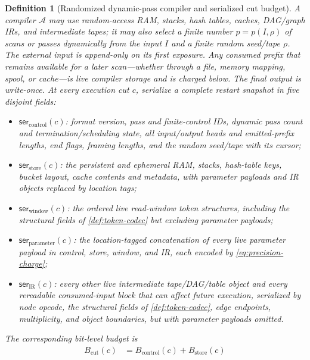 \documentclass[a4paper,twocolumn,10pt,unpublished]{quantumarticle}
\newtheorem{definition}{Definition}
\begin{document}
\begin{definition}[Randomized dynamic-pass compiler and serialized cut budget]
\label{def:compiler}
A compiler $\mathcal A$ may use random-access RAM, stacks, hash tables,
caches, DAG/graph IRs, and intermediate tapes; it may also select a finite
number $p=p(I,\rho)$ of scans or passes dynamically from the input $I$ and
a finite random seed/tape $\rho$.  The external input is append-only on its
first exposure.  Any consumed prefix that remains available for a later
scan---whether through a file, memory mapping, spool, or cache---is live
compiler storage and is charged below.  The final output is write-once.
At every execution cut $c$, serialize a complete restart snapshot in five
disjoint fields:
\begin{itemize}[leftmargin=1.5em]
    \item $\mathsf{ser}_{\mathrm{control}}(c)$: format version, pass and
    finite-control IDs, dynamic pass count and termination/scheduling state,
    all input/output heads and emitted-prefix lengths, end flags, framing
    lengths, and the random seed/tape with its cursor;
    \item $\mathsf{ser}_{\mathrm{store}}(c)$: the persistent and ephemeral
    RAM, stacks, hash-table keys, bucket layout, cache contents and metadata,
    with parameter payloads and IR objects replaced by location tags;
    \item $\mathsf{ser}_{\mathrm{window}}(c)$: the ordered live read-window
    token structures, including the structural fields of
    \cref{def:token-codec} but excluding parameter payloads;
    \item $\mathsf{ser}_{\mathrm{parameter}}(c)$: the location-tagged
    concatenation of every live parameter payload in control, store, window,
    and IR, each encoded by \eqref{eq:precision-charge};
    \item $\mathsf{ser}_{\mathrm{IR}}(c)$: every other live intermediate
    tape/DAG/table object and every rereadable consumed-input block that can
    affect future execution, serialized by node opcode, the structural
    fields of \cref{def:token-codec}, edge endpoints, multiplicity, and
    object boundaries, but with parameter payloads omitted.
\end{itemize}
The corresponding bit-level budget is
\begin{equation}
\label{eq:info-budget}
\boxed{
\begin{aligned}
B_{\mathrm{cut}}(c)
&=B_{\mathrm{control}}(c)+B_{\mathrm{store}}(c)\\

\end{aligned}}
\end{equation}
\end{definition}
\end{document}
